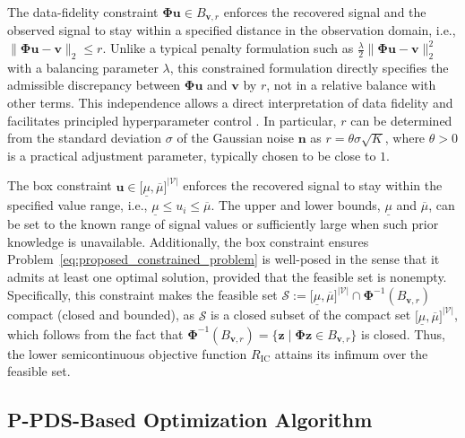 The data-fidelity constraint $\boldsymbol{\Phi}\mathbf{u}\in B_{\mathbf{v},r}$ enforces the recovered signal and the observed signal to stay within a specified distance in the observation domain, i.e., $\lVert \boldsymbol{\Phi}\mathbf{u}-\mathbf{v}\rVert_2\leq r$.
Unlike a typical penalty formulation such as $\frac{\lambda}{2}\lVert \boldsymbol{\Phi}\mathbf{u}-\mathbf{v}\rVert_2^2$ with a balancing parameter $\lambda$, this constrained formulation directly specifies the admissible discrepancy between $\boldsymbol{\Phi}\mathbf{u}$ and $\mathbf{v}$ by $r$, not in a relative balance with other terms.
This independence allows a direct interpretation of data fidelity and facilitates principled hyperparameter control \cite{Afonso2010, OnoYamada2015, Chierchia2015, Ono2017PnP, Ono2017L0}.
In particular, $r$ can be determined from the standard deviation $\sigma$ of the Gaussian noise $\mathbf{n}$ as $r = \theta \sigma \sqrt{K}$, where $\theta>0$ is a practical adjustment parameter, typically chosen to be close to $1$.

The box constraint $\mathbf{u}\in \lbrack \underline{\mu},\overline{\mu} \rbrack^{|\mathcal{V}|}$ enforces the recovered signal to stay within the specified value range, i.e., $\underline{\mu} \leq u_i \leq \overline{\mu}$.
The upper and lower bounds, $\underline{\mu}$ and $\overline{\mu}$, can be set to the known range of signal values or sufficiently large when such prior knowledge is unavailable.
Additionally, the box constraint ensures Problem~\eqref{eq:proposed_constrained_problem} is well-posed in the sense that it admits at least one optimal solution, provided that the feasible set is nonempty.
Specifically, this constraint makes the feasible set $\mathcal{S}:=\lbrack \underline{\mu},\overline{\mu} \rbrack^{|\mathcal{V}|}\cap\boldsymbol{\Phi}^{-1}(B_{\mathbf{v},r})$ compact (closed and bounded), as $\mathcal{S}$ is a closed subset of the compact set $\lbrack \underline{\mu},\overline{\mu} \rbrack^{|\mathcal{V}|}$, which follows from the fact that $\boldsymbol{\Phi}^{-1}(B_{\mathbf{v},r}) = \{\mathbf{z} \mid \boldsymbol{\Phi} \mathbf{z} \in B_{\mathbf{v}, r}\}$ is closed.
Thus, the lower semicontinuous objective function $R_\mathrm{IC}$ attains its infimum over the feasible set.


\subsection{P-PDS-Based Optimization Algorithm}
\label{subsec:optimization_algorithm}

